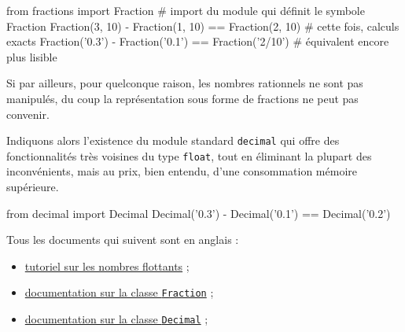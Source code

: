 \begin{idleconsole*}
	\begin{pyconsole}
		from fractions import Fraction  # import du module qui définit le symbole Fraction
		Fraction(3, 10) - Fraction(1, 10) == Fraction(2, 10)  # cette fois, calculs exacts
		Fraction('0.3') - Fraction('0.1') == Fraction('2/10')  # équivalent encore plus lisible
	\end{pyconsole}
\end{idleconsole*}

\vspace{1pt}


Si par ailleurs, pour quelconque raison, les nombres rationnels ne sont pas manipulés, du coup la représentation sous forme de fractions ne peut pas convenir. 

Indiquons alors l'existence du module standard \texttt{decimal} qui offre des fonctionnalités très voisines du type \texttt{float}, tout en éliminant la plupart des inconvénients, mais au prix, bien entendu, d'une consommation mémoire supérieure.

\begin{idleconsole}
	\begin{pyconsole}
		from decimal import Decimal
		Decimal('0.3') - Decimal('0.1') == Decimal('0.2')
	\end{pyconsole}
\end{idleconsole}

\begin{gofurther}
Tous les documents qui suivent sont en anglais :
\begin{itemize}\jazzitem
\item \href{https://docs.python.org/3/tutorial/floatingpoint.html}{tutoriel sur les nombres flottants} ;
\item \href{https://docs.python.org/3/library/fractions.html}{documentation sur la classe \texttt{Fraction}} ;
\item \href{https://docs.python.org/3/library/decimal.html}{documentation sur la classe \texttt{Decimal}} ;
\end{itemize}
\end{gofurther}


